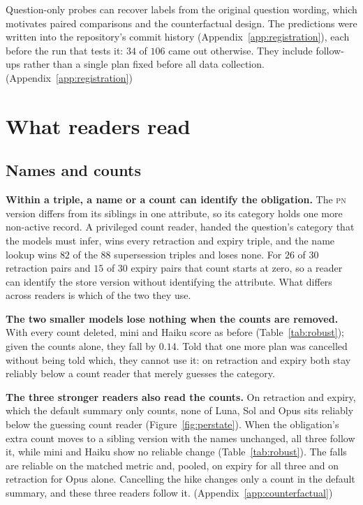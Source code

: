 \documentclass{article}
\newcommand{\claim}[1]{\textbf{#1}}
\newcommand{\pn}{\textsc{pn}}
\begin{document}
Question-only probes can recover labels from the original question wording, which motivates paired comparisons and the counterfactual design. The predictions were written into the repository's commit history (Appendix~\ref{app:registration}), each before the run that tests it: $34$ of $106$ came out otherwise. They include follow-ups rather than a single plan fixed before all data collection. (Appendix~\ref{app:registration})


\section{What readers read}\label{sec:counterfactual}\label{sec:readers}
\subsection{Names and counts}\label{sec:names_counts}
\claim{Within a triple, a name or a count can identify the obligation.}
The \pn{} version differs from its siblings in one attribute, so its category holds one more non-active record. A privileged count reader, handed the question's category that the models must infer, wins every retraction and expiry triple, and the name lookup wins $82$ of the $88$ supersession triples and loses none. For $26$ of $30$ retraction pairs and $15$ of $30$ expiry pairs that count starts at zero, so a reader can identify the store version without identifying the attribute. What differs across readers is which of the two they use.

\claim{The two smaller models lose nothing when the counts are removed.}
With every count deleted, mini and Haiku score as before (Table~\ref{tab:robust}); given the counts alone, they fall by $0.14$. Told that one more plan was cancelled without being told which, they cannot use it: on retraction and expiry both stay reliably below a count reader that merely guesses the category.

\claim{The three stronger readers also read the counts.}
On retraction and expiry, which the default summary only counts, none of Luna, Sol and Opus sits reliably below the guessing count reader (Figure~\ref{fig:perstate}). When the obligation's extra count moves to a sibling version with the names unchanged, all three follow it, while mini and Haiku show no reliable change (Table~\ref{tab:robust}). The falls are reliable on the matched metric and, pooled, on expiry for all three and on retraction for Opus alone. Cancelling the hike changes only a count in the default summary, and these three readers follow it. (Appendix~\ref{app:counterfactual})
\end{document}
